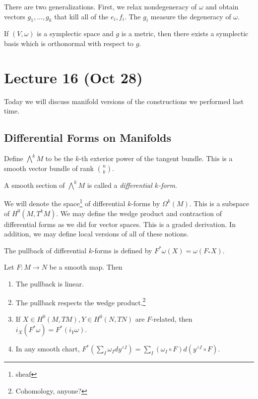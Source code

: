 \documentclass[twoside, 10pt]{article}
\begin{document}
    There are two generalizations. First, we relax nondegeneracy of $\omega$ and obtain vectors $g_1, \ldots, g_k$ that kill all of the $e_i,f_i$. The $g_i$ measure the degeneracy of $\omega$.

    If $(V,\omega)$ is a symplectic space and $g$ is a metric, then there exists a symplectic basis which is orthonormal with respect to $g$.

    \section{Lecture 16 (Oct 28)}%
    \label{sec:lecture_16_oct_28_}
    
    Today we will discuss manifold versions of the constructions we performed last time. 

    \subsection{Differential Forms on Manifolds}%
    \label{sub:differential_forms_on_manifolds}
    
    Define $\bigwedge^kM$ to be the $k$-th exterior power of the tangent bundle. This is a smooth vector bundle of rank $\binom{n}{k}$.

    \begin{defn}
        A smooth section of $\bigwedge^k M$ is called a \textit{differential $k$-form}.
    \end{defn}

    We will denote the space\footnote{sheaf} of differential $k$-forms by $\Omega^k(M)$. This is a subspace of $H^0(M, T^kM)$. We may define the wedge product and contraction of differential forms as we did for vector spaces. This is a graded derivation. In addition, we may define local versions of all of these notions.

    \begin{defn}
        The pullback of differential $k$-forms is defined by $F^*\omega (X) = \omega (F_*X)$.
    \end{defn}

    \begin{lem}
        Let $F:M \to N$ be a smooth map. Then
        \begin{enumerate}
            \item The pullback is linear.
            \item The pullback respects the wedge product.\footnote{Cohomology, anyone?}
            \item If $X \in H^0(M,TM), Y \in H^0(N,TN)$ are $F$-related, then $i_X(F^*\omega) = F^*(i_Y \omega)$.
            \item In any smooth chart, $F^*(\sum_I \omega_I dy^{\wedge I}) = \sum_I (\omega_I \circ F) d(y^{\wedge I} \circ F)$.
        \end{enumerate}
    \end{lem}
\end{document}
